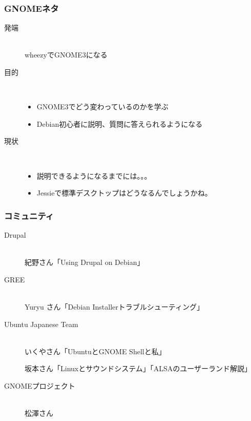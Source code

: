 \documentclass[cjk,dvipdfmx,10pt,compress,%
hyperref={bookmarks=true,bookmarksnumbered=true,bookmarksopen=false,%
colorlinks=false,%
pdftitle={第 79 回 関西 Debian 勉強会},%
pdfauthor={倉敷・のがた・佐々木・かわだ・八津尾},%
pdfsubject={資料},%
}]{beamer}
\begin{document}
\begin{frame}
  \frametitle{GNOMEネタ}
  \begin{description}
  \item[発端]\mbox{~}\\
    wheezyでGNOME3になる
  \item[目的]\mbox{~}\\
    \begin{itemize}
    \item
      GNOME3でどう変わっているのかを学ぶ
    \item
      Debian初心者に説明、質問に答えられるようになる
    \end{itemize}
  \item[現状]\mbox{~}\\
    \begin{itemize}
    \item 説明できるようになるまでには。。。
    \item Jessieで標準デスクトップはどうなるんでしょうかね。
    \end{itemize}
  \end{description}
\end{frame}

\begin{frame}
  \frametitle{コミュニティ}
  \begin{description}
  \item[Drupal] \mbox{~}\\

    紀野さん「Using Drupal on Debian」
  \item[GREE] \mbox{~}\\

    Yuryu さん「Debian Installerトラブルシューティング」
  \item[Ubuntu Japanese Team] \mbox{~}\\

    いくやさん「UbuntuとGNOME Shellと私」

    坂本さん「Linuxとサウンドシステム」「ALSAのユーザーランド解説」
  \item[GNOMEプロジェクト] \mbox{~}\\

    松澤さん
  \end{description}
\end{frame}
\end{document}
